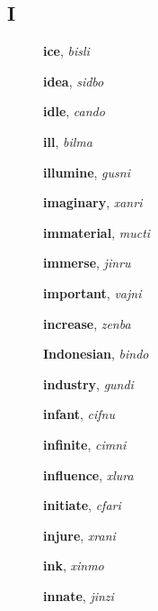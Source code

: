 \documentclass[12pt]{book}
\begin{document}
\subsection{I} %

\begin{description}

\item[ ] \textbf{ice}, \textit{bisli}

\item[ ] \textbf{idea}, \textit{sidbo}

\item[ ] \textbf{idle}, \textit{cando}

\item[ ] \textbf{ill}, \textit{bilma}

\item[ ] \textbf{illumine}, \textit{gusni}

\item[ ] \textbf{imaginary}, \textit{xanri}

\item[ ] \textbf{immaterial}, \textit{mucti}

\item[ ] \textbf{immerse}, \textit{jinru}

\item[ ] \textbf{important}, \textit{vajni}

\item[ ] \textbf{increase}, \textit{zenba}

\item[ ] \textbf{Indonesian}, \textit{bindo}

\item[ ] \textbf{industry}, \textit{gundi}

\item[ ] \textbf{infant}, \textit{cifnu}

\item[ ] \textbf{infinite}, \textit{cimni}

\item[ ] \textbf{influence}, \textit{xlura}

\item[ ] \textbf{initiate}, \textit{cfari}

\item[ ] \textbf{injure}, \textit{xrani}

\item[ ] \textbf{ink}, \textit{xinmo}

\item[ ] \textbf{innate}, \textit{jinzi}


\end{description}
\end{document}
